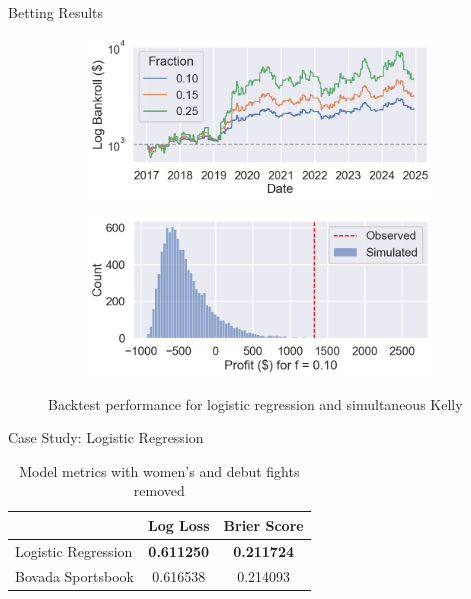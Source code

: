 \documentclass[final]{beamer}
\newlength{\colwidth}
\begin{document}
\begin{frame}[t]
\begin{columns}[t]
\begin{column}{\colwidth}
\begin{block}{Betting Results}
    \begin{figure}
        \centering
        \captionsetup{justification=centering}
        \begin{subfigure}{.49\linewidth}
            \centering
            \includegraphics[width=\linewidth]{figures/lr_bankroll.png}
        \end{subfigure}
        \begin{subfigure}{.49\linewidth}
            \centering
            \includegraphics[width=\linewidth]{figures/lr_0.1_null_dist.png}
        \end{subfigure}
        \caption{Backtest performance for logistic regression and simultaneous Kelly}
    \end{figure}

  \end{block}
  \vspace{-6pt}
  \begin{block}{Case Study: Logistic Regression}
      \scriptsize
        \begin{table}[!htb]
        \centering
        \begin{tabular}{@{}lcc@{}}
        \toprule
                            & Log Loss & Brier Score \\ \midrule
        Logistic Regression & \textbf{0.611250} & \textbf{0.211724}    \\
        Bovada Sportsbook   & 0.616538 & 0.214093    \\ \bottomrule
        \end{tabular}
        \normalsize
        \caption{Model metrics with women's and debut fights removed}
        \end{table}


\end{block}
\end{column}
\end{columns}
\end{frame}
\end{document}

